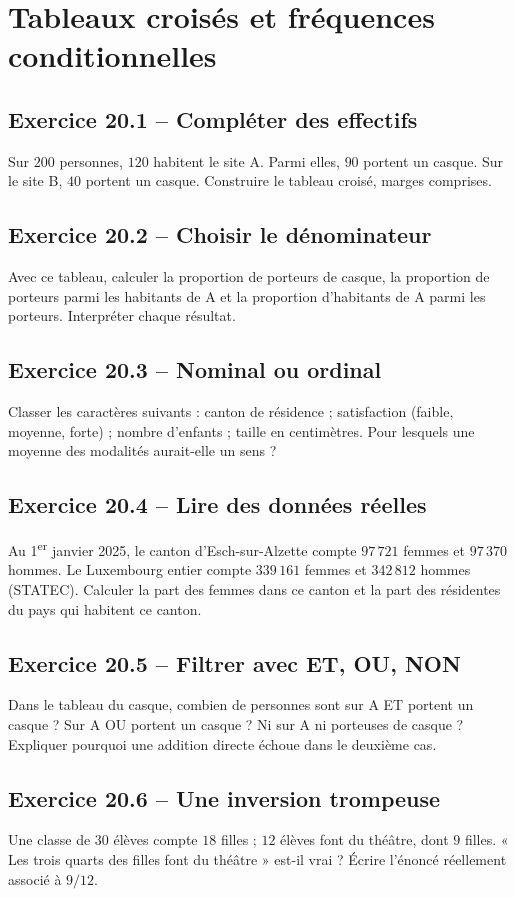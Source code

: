 \chapter{Tableaux croisés et fréquences conditionnelles}
\section*{Exercice 20.1 -- Compléter des effectifs}
Sur $200$ personnes, $120$ habitent le site A. Parmi elles, $90$ portent un casque. Sur le site B, $40$ portent un casque. Construire le tableau croisé, marges comprises.

\section*{Exercice 20.2 -- Choisir le dénominateur}
Avec ce tableau, calculer la proportion de porteurs de casque, la proportion de porteurs parmi les habitants de A et la proportion d'habitants de A parmi les porteurs. Interpréter chaque résultat.

\section*{Exercice 20.3 -- Nominal ou ordinal}
Classer les caractères suivants : canton de résidence ; satisfaction (faible, moyenne, forte) ; nombre d'enfants ; taille en centimètres. Pour lesquels une moyenne des modalités aurait-elle un sens ?

\section*{Exercice 20.4 -- Lire des données réelles}
Au 1\textsuperscript{er} janvier 2025, le canton d'Esch-sur-Alzette compte $97\,721$ femmes et $97\,370$ hommes. Le Luxembourg entier compte $339\,161$ femmes et $342\,812$ hommes (STATEC). Calculer la part des femmes dans ce canton et la part des résidentes du pays qui habitent ce canton.

\section*{Exercice 20.5 -- Filtrer avec ET, OU, NON}
Dans le tableau du casque, combien de personnes sont sur A ET portent un casque ? Sur A OU portent un casque ? Ni sur A ni porteuses de casque ? Expliquer pourquoi une addition directe échoue dans le deuxième cas.

\section*{Exercice 20.6 -- Une inversion trompeuse}
Une classe de $30$ élèves compte $18$ filles ; $12$ élèves font du théâtre, dont $9$ filles. « Les trois quarts des filles font du théâtre » est-il vrai ? Écrire l'énoncé réellement associé à $9/12$.
